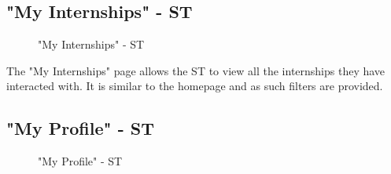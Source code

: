 \subsection{"My Internships" - ST}
\label{subsec:my-internships-st}%

\begin{figure}[H]
    \centering
    \caption{"My Internships" - ST}
    \label{fig:my-internships-st}
\end{figure}

\par The "My Internships" page allows the ST to view all the internships they have interacted with. It is similar to
the homepage and as such filters are provided.

\subsection{"My Profile" - ST}
\label{subsec:profile-st}%

\begin{figure}[H]
    \centering
    \caption{"My Profile" - ST}
    \label{fig:profile-st}
\end{figure}

